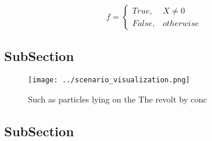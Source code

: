 \documentclass[a4paper]{article}
\begin{document}
\begin{equation}   f =
\begin{cases} True, & X \neq 0\\
False, & otherwise
\end{cases}
\end{equation}

\subsection{SubSection}

\begin{figure}
\centering
\texttt{[image: ../scenario\_visualization.png]}
\caption{Such as particles lying on the The revolt by conc
}
\end{figure}
 
\subsection{SubSection}
\end{document}
